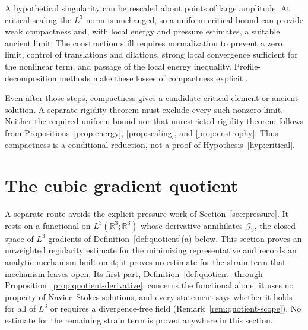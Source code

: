\documentclass[11pt]{article}
\theoremstyle{definition}
\theoremstyle{plain}
\newcommand{\R}{\mathbb R}
\begin{document}
A hypothetical singularity can be rescaled about points of large amplitude.
At critical scaling the $L^3$ norm is unchanged, so a uniform critical bound
can provide weak compactness and, with local energy and pressure estimates, a
suitable ancient limit.  The construction still requires normalization to
prevent a zero limit, control of translations and dilations, strong local
convergence sufficient for the nonlinear term, and passage of the local
energy inequality.  Profile-decomposition methods make these losses of
compactness explicit \cite{GKP2013}.

Even after those steps, compactness gives a candidate critical element or
ancient solution.  A separate rigidity theorem must exclude every such
nonzero limit.  Neither the required uniform bound nor that unrestricted
rigidity theorem follows from Propositions~\ref{prop:energy},
\ref{prop:scaling}, and \ref{prop:enstrophy}.  Thus compactness is a
conditional reduction, not a proof of Hypothesis~\ref{hyp:critical}.

\section{The cubic gradient quotient}
\label{sec:quotient}

A separate route avoids the explicit pressure work of
Section~\ref{sec:pressure}.  It rests on a functional on
$L^3(\R^3;\R^3)$ whose derivative annihilates $\mathcal G_3$, the closed
space of $L^3$ gradients of Definition~\ref{def:quotient}(a) below.  This
section proves an unweighted regularity estimate for the minimizing
representative and records an analytic mechanism built on it; it proves no
estimate for the strain term that mechanism leaves open.  Its first part,
Definition~\ref{def:quotient} through
Proposition~\ref{prop:quotient-derivative}, concerns the functional alone:
it uses no property of Navier--Stokes solutions, and every statement says
whether it holds for all of $L^3$ or requires a divergence-free field
(Remark~\ref{rem:quotient-scope}).  No estimate for the remaining strain
term is proved anywhere in this section.
\end{document}
